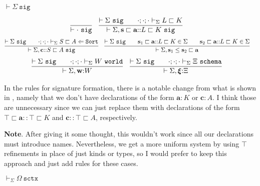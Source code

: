 \documentclass[letterpaper, 11pt]{article}
\newcommand{\Lar}{\Leftarrow}
\newcommand{\Sort}{\texttt{Sort}}
\newcommand{\world}{\texttt{world}}
\newcommand{\schema}{\texttt{schema}}
\newcommand{\sctx}{\texttt{sctx}}
\newcommand{\sig}{\texttt{sig}}
\begin{document}
    $\boxed{\vdash \Sigma \ \sig}$
    
    \begin{align*}
        & \infer{\vdash \cdot \ \sig}{} &
        & \infer{\vdash \Sigma, \textbf{s} \sqsubset \textbf{a} {::} L \sqsubset K \ \sig}
          {
            \vdash \Sigma \ \sig
            &&
            \cdot ; \cdot ; \cdot \vdash_\Sigma L \sqsubset K
          }
    \end{align*}
    \begin{align*}
        & \infer{\vdash \Sigma, \textbf{c} {::} S \sqsubset A \ \sig}
          {
            \vdash \Sigma \ \sig
            &&
            \cdot ; \cdot ; \cdot \vdash_\Sigma S \sqsubset A \Lar \Sort
          } &
        & \infer{\vdash \Sigma, \textbf{s}_1 \leq \textbf{s}_2 \sqsubset \textbf{a}}
          {
            \vdash \Sigma \ \sig
            &&
            \textbf{s}_1 \sqsubset \textbf{a} {::} L \sqsubset K \in \Sigma
            &&
            \textbf{s}_2 \sqsubset \textbf{a} {::} L \sqsubset K \in \Sigma
          }
    \end{align*}
    \begin{align*}
        & \infer{\vdash \Sigma , \textbf{w} {:} W}
          {
            \vdash \Sigma \ \sig
            &&
            \cdot ; \cdot ; \cdot \vdash_\Sigma W \ \world
          } &
        & \infer{\vdash \Sigma , \boldsymbol{\xi} {:} \Xi}
          {
            \vdash \Sigma \ \sig
            &&
            \cdot ; \cdot ; \cdot \vdash_\Sigma \Xi \ \schema
          } &
    \end{align*}

    In the rules for signature formation, there is a notable change from what is shown in \cite{LovasPfenning2010}, namely that we don't have
    declarations of the form $\textbf{a} {:} K$ or $\textbf{c} : A$.  I think those are unnecessary since we can just replace them with declarations
    of the form $\top \sqsubset \textbf{a} {::} \top \sqsubset K$ and $\textbf{c} {::} \top \sqsubset A$, respectively.

    \textbf{Note}.  After giving it some thought, this wouldn't work since all our declarations must introduce names.  Nevertheless, we get a more
    uniform system by using $\top$ refinements in place of just kinds or types, so I would prefer to keep this approach and just add rules for
    these cases.

    $\boxed{\vdash_\Sigma \Omega \ \sctx}$
\end{document}
